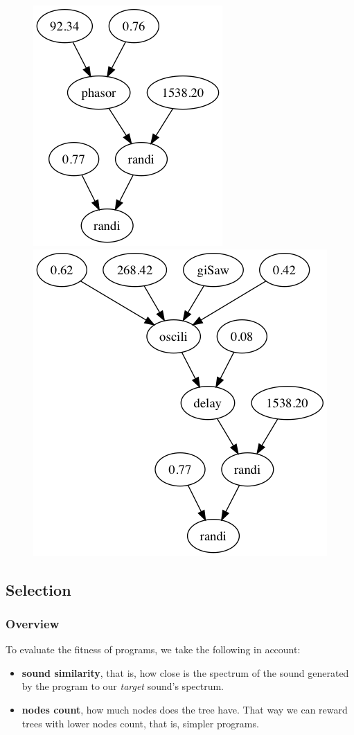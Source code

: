 \documentclass{article}
\begin{document}
\begin{figure}[H]
\centering
\begin{minipage}{.5\textwidth}
  \centering
  \includegraphics[width=.4\linewidth]{cross_before.png}
\end{minipage}%
\begin{minipage}{.5\textwidth}
  \centering
  \includegraphics[width=.4\linewidth]{cross_after.png}
\end{minipage}
\end{figure}

\subsection{Selection}

\subsubsection{Overview}

To evaluate the fitness of programs, we take the following in account:
\begin{itemize}
    \item \textbf{sound similarity}, that is, how close is the spectrum of the sound generated by the program to our \textit{target} sound's spectrum.
    \item \textbf{nodes count}, how much nodes does the tree have. That way we can reward trees with lower nodes count, that is, simpler programs. 
\end{itemize}
\end{document}
